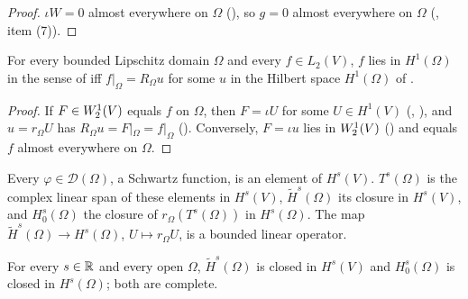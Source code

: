 \begin{proof}
\leanok
$\iota W = 0$ almost everywhere on $\Omega$ (), so $g = 0$
almost everywhere on $\Omega$ (, item (7)).
\end{proof}

\begin{theorem}
\label{thm:sobolev-restriction-lipschitz}
\leanok
{}
For every bounded Lipschitz domain $\Omega$ and every $f \in L_2(V)$, $f$ lies in $H^1(\Omega)$
in the sense of  iff $f|_\Omega = R_\Omega u$ for some $u$ in
the Hilbert space $H^1(\Omega)$ of .
\end{theorem}

\begin{proof}
\leanok
If $F \in W^{1}_{2}(V)$ equals $f$ on $\Omega$, then $F = \iota U$ for some $U \in H^1(V)$
(, ), and $u = r_\Omega U$ has
$R_\Omega u = F|_\Omega = f|_\Omega$ (). Conversely,
$F = \iota u$ lies in $W^{1}_{2}(V)$ () and equals $f$
almost everywhere on $\Omega$.
\end{proof}

\begin{definition}
\label{def:sobolev-tilde-zero-boundary}
\leanok
{}
Every $\varphi \in \mathcal D(\Omega)$, a Schwartz function, is an element of $H^s(V)$.
$T^s(\Omega)$ is the complex linear span of these elements in $H^s(V)$, $\tilde H^s(\Omega)$
its closure in $H^s(V)$, and $H^s_0(\Omega)$ the closure of $r_\Omega(T^s(\Omega))$ in
$H^s(\Omega)$. The map
$\tilde H^s(\Omega) \to H^s(\Omega)$, $U \mapsto r_\Omega U$, is a bounded linear operator.
\end{definition}

\begin{lemma}
\label{lem:sobolev-tilde-zero-boundary-closed}
\leanok
{}
For every $s \in \mathbb{R}$ and every open $\Omega$, $\tilde H^s(\Omega)$ is closed in $H^s(V)$ and
$H^s_0(\Omega)$ is closed in $H^s(\Omega)$; both are complete.
\end{lemma}

